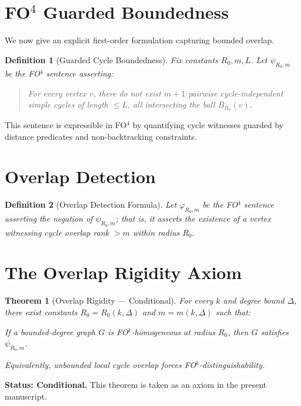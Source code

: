 \documentclass[11pt]{article}
\newtheorem{theorem}{Theorem}
\newtheorem{definition}{Definition}
\begin{document}
\section{FO$^4$ Guarded Boundedness}

We now give an explicit first-order formulation capturing bounded overlap.

\begin{definition}[Guarded Cycle Boundedness]
Fix constants $R_0, m, L$. Let $\psi_{R_0,m}$ be the FO$^4$ sentence asserting:

\begin{quote}
For every vertex $v$, there do not exist $m+1$ pairwise cycle-independent simple
cycles of length $\le L$, all intersecting the ball $B_{R_0}(v)$.
\end{quote}
\end{definition}

This sentence is expressible in FO$^4$ by quantifying cycle witnesses guarded by
distance predicates and non-backtracking constraints.

\section{Overlap Detection}

\begin{definition}[Overlap Detection Formula]
Let $\varphi_{R_0,m}$ be the FO$^4$ sentence asserting the negation of
$\psi_{R_0,m}$; that is, it asserts the existence of a vertex witnessing
cycle overlap rank $> m$ within radius $R_0$.
\end{definition}

\section{The Overlap Rigidity Axiom}

\begin{theorem}[Overlap Rigidity --- Conditional]
\label{thm:overlap}
For every $k$ and degree bound $\Delta$, there exist constants
$R_0 = R_0(k,\Delta)$ and $m = m(k,\Delta)$ such that:

If a bounded-degree graph $G$ is FO$^k$-homogeneous at radius $R_0$,
then $G$ satisfies $\psi_{R_0,m}$.

Equivalently, unbounded local cycle overlap forces FO$^k$-distinguishability.
\end{theorem}

\textbf{Status: Conditional.}  
This theorem is taken as an axiom in the present manuscript.
\end{document}
